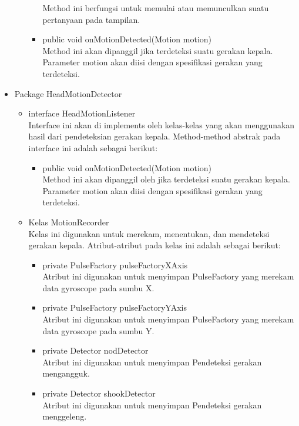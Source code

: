 \begin{itemize}
\begin{itemize}
\begin{itemize}
            Method ini berfungsi untuk memulai atau memunculkan suatu pertanyaan pada tampilan.
            \item public void onMotionDetected(Motion motion)\\
            Method ini akan dipanggil jika terdeteksi suatu gerakan kepala. Parameter motion akan diisi dengan spesifikasi gerakan yang terdeteksi.
        \end{itemize}
    \end{itemize}
    \item Package HeadMotionDetector
    \begin{itemize}
        \item interface HeadMotionListener\\
        Interface ini akan di implements oleh kelas-kelas yang akan menggunakan hasil dari pendeteksian gerakan kepala.
        Method-method abstrak pada interface ini adalah sebagai berikut:
        \begin{itemize}
            \item public void onMotionDetected(Motion motion)\\
            Method ini akan dipanggil oleh jika terdeteksi suatu gerakan kepala. Parameter motion akan diisi dengan spesifikasi gerakan yang terdeteksi.
        \end{itemize}
        \item Kelas MotionRecorder\\
        Kelas ini digunakan untuk merekam, menentukan, dan mendeteksi gerakan kepala. 
        Atribut-atribut pada kelas ini adalah sebagai berikut:
        \begin{itemize}
            \item private PulseFactory pulseFactoryXAxis\\
            Atribut ini digunakan untuk menyimpan PulseFactory yang merekam data gyroscope pada sumbu X.
            \item private PulseFactory pulseFactoryYAxis\\
            Atribut ini digunakan untuk menyimpan PulseFactory yang merekam data gyroscope pada sumbu Y.
            \item private Detector nodDetector\\
            Atribut ini digunakan untuk menyimpan Pendeteksi gerakan mengangguk.
            \item private Detector shookDetector\\
            Atribut ini digunakan untuk menyimpan Pendeteksi gerakan menggeleng.

\end{itemize}
\end{itemize}
\end{itemize}
